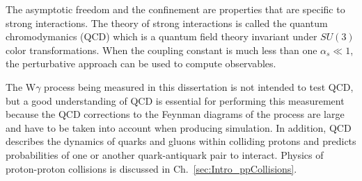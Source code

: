 The asymptotic freedom and the confinement are properties that are specific to strong interactions. The theory of strong interactions is called the quantum chromodymanics (QCD) which is a quantum field theory invariant under $SU(3)$ color transformations. When the coupling constant is much less than one $\alpha_s \ll 1$, the perturbative approach can be used to compute observables.

The W$\gamma$ process being measured in this dissertation is not intended to test QCD, but a good understanding of QCD is essential for performing this measurement because the QCD corrections to the Feynman diagrams of the process are large and have to be taken into account when producing simulation. In addition, QCD describes the dynamics of quarks and gluons within colliding protons and predicts probabilities of one or another quark-antiquark pair to interact. Physics of proton-proton collisions is discussed in Ch.~\ref{sec:Intro_ppCollisions}. 

